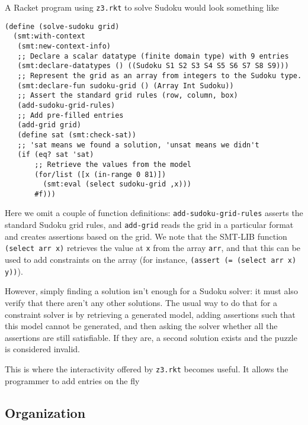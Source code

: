 A Racket program using \texttt{z3.rkt} to solve Sudoku would look something like

\begin{verbatim}
(define (solve-sudoku grid)
  (smt:with-context
   (smt:new-context-info)
   ;; Declare a scalar datatype (finite domain type) with 9 entries
   (smt:declare-datatypes () ((Sudoku S1 S2 S3 S4 S5 S6 S7 S8 S9)))
   ;; Represent the grid as an array from integers to the Sudoku type.
   (smt:declare-fun sudoku-grid () (Array Int Sudoku))
   ;; Assert the standard grid rules (row, column, box)
   (add-sudoku-grid-rules)
   ;; Add pre-filled entries
   (add-grid grid)
   (define sat (smt:check-sat))
   ;; 'sat means we found a solution, 'unsat means we didn't
   (if (eq? sat 'sat)
       ;; Retrieve the values from the model
       (for/list ([x (in-range 0 81)])
         (smt:eval (select sudoku-grid ,x)))
       #f)))
\end{verbatim}

Here we omit a couple of function definitions: \texttt{add-sudoku-grid-rules}
asserts the standard Sudoku grid rules, and \texttt{add-grid} reads the grid in
a particular format and creates assertions based on the grid. We note that the
SMT-LIB function \texttt{(select arr x)} retrieves the value at \texttt{x} from
the array \texttt{arr}, and that this can be used to add constraints on the
array (for instance, \texttt{(assert (= (select arr x) y))}).

However, simply finding a solution isn't enough for a Sudoku solver: it must
also verify that there aren't any other solutions. The usual way to do that for
a constraint solver is by retrieving a generated model, adding assertions such
that this model cannot be generated, and then asking the solver whether all the
assertions are still satisfiable. If they are, a second solution exists and the
puzzle is considered invalid.

This is where the interactivity offered by \texttt{z3.rkt} becomes useful. It
allows the programmer to add entries on the fly

\subsection{Organization}
